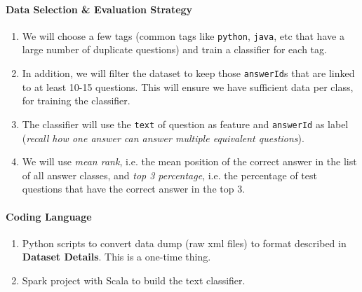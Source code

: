 \documentclass{article}
\begin{document}
\paragraph{Data Selection \& Evaluation Strategy}
\begin{enumerate}
	\item We will choose a few tags (common tags like \texttt{python}, \texttt{java}, etc that have a large number of duplicate questions) and train a classifier for each tag.
	\item In addition, we will filter the dataset to keep those \texttt{answerId}s that are linked to at least 10-15 questions. This will ensure we have sufficient data per class, for training the classifier.
	\item The classifier will use the \texttt{text} of question as feature and \texttt{answerId} as label (\textit{recall how one answer can answer multiple equivalent questions}).
	\item We will use \textit{mean rank}, i.e. the mean position of the correct answer in the list of all answer classes, and \textit{top 3 percentage}, i.e. the percentage of test questions that have the correct answer in the top 3.
\end{enumerate}

\paragraph{Coding Language}
\begin{enumerate}
	\item Python scripts to convert data dump (raw xml files) to format described in \textbf{Dataset Details}. This is a one-time thing.
	\item Spark project with Scala to build the text classifier.
\end{enumerate}
\end{document}

